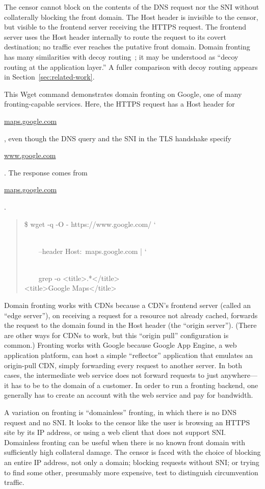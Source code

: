 \documentclass{sig-alternate}
\def\urll#1{\begin{NoHyper}\url{#1}\end{NoHyper}}
\begin{document}
The censor cannot block on the contents of the DNS request nor the SNI without
collaterally blocking the front domain.
The Host header is invisible to the censor,
but visible to the frontend server receiving the HTTPS request.
The frontend server uses the Host header internally to route the request
to its covert destination; no traffic ever reaches the putative front domain.
Domain fronting has many similarities with decoy routing~\cite{decoyrouting,telex,cirripede,tapdance};
it may be understood as
``decoy routing at the application layer.''
A fuller comparison with decoy routing appears in Section~\ref{sec:related-work}.

This Wget command demonstrates domain fronting
on Google, one of many fronting-capable services.
Here, the HTTPS request has a Host header for \urll{maps.google.com},
even though the DNS query and the SNI in the TLS handshake specify \urll{www.google.com}.
The response comes from \urll{maps.google.com}.

\noindent
\begin{quote}
%
\$ wget -q -O - https://www.google.com/ \char`\\\\
\strut~~~~--header \textquotesingle{}Host:~maps.google.com\textquotesingle{} | \char`\\\\
\strut~~~~grep -o \textquotesingle{}<title>.*</title>\textquotesingle{}\\
<title>Google Maps</title>
\end{quote}

Domain fronting works with CDNs because a CDN's frontend server
(called an ``edge server''),
on receiving a request for a resource not already cached,
forwards the request to the domain found in the Host header
(the ``origin server'').
(There are other ways for CDNs to work, but this ``origin pull''
configuration is common.)
Fronting works with Google because Google App Engine, a web application platform,
can host a simple ``reflector'' application that emulates
an origin-pull CDN, simply forwarding every request to another server.
In both cases, the intermediate web service does not forward requests to just anywhere---it
has to be to the domain of a customer.
In order to run a fronting backend,
one generally has to create an account with the web service and pay for bandwidth.

A variation on fronting is ``domainless'' fronting,
in which there is no DNS request and no SNI.
It looks to the censor
like the user is browsing an HTTPS site by its IP address,
or using a web client that does not support SNI.
Domainless fronting can be useful when there is no known front domain
with sufficiently high collateral damage.
The censor is faced with the choice of blocking an entire IP address, not only a domain;
blocking requests without SNI;
or trying to find some other, presumably more expensive, test to distinguish
circumvention traffic.
\end{document}
